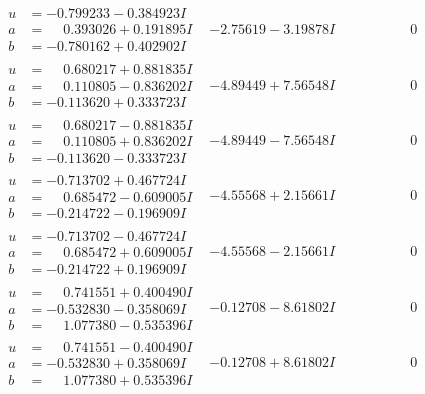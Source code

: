 \documentclass[1p]{elsarticle_modified}
\theoremstyle{definition}
\begin{document}
$$\begin{array}{c|c|c}
\begin{aligned}
u &= -0.799233 - 0.384923 I \\
a &= \phantom{-}0.393026 + 0.191895 I \\
b &= -0.780162 + 0.402902 I\end{aligned}
 & -2.75619 - 3.19878 I & \phantom{-0.000000 } 0 \\ \hline\begin{aligned}
u &= \phantom{-}0.680217 + 0.881835 I \\
a &= \phantom{-}0.110805 - 0.836202 I \\
b &= -0.113620 + 0.333723 I\end{aligned}
 & -4.89449 + 7.56548 I & \phantom{-0.000000 } 0 \\ \hline\begin{aligned}
u &= \phantom{-}0.680217 - 0.881835 I \\
a &= \phantom{-}0.110805 + 0.836202 I \\
b &= -0.113620 - 0.333723 I\end{aligned}
 & -4.89449 - 7.56548 I & \phantom{-0.000000 } 0 \\ \hline\begin{aligned}
u &= -0.713702 + 0.467724 I \\
a &= \phantom{-}0.685472 - 0.609005 I \\
b &= -0.214722 - 0.196909 I\end{aligned}
 & -4.55568 + 2.15661 I & \phantom{-0.000000 } 0 \\ \hline\begin{aligned}
u &= -0.713702 - 0.467724 I \\
a &= \phantom{-}0.685472 + 0.609005 I \\
b &= -0.214722 + 0.196909 I\end{aligned}
 & -4.55568 - 2.15661 I & \phantom{-0.000000 } 0 \\ \hline\begin{aligned}
u &= \phantom{-}0.741551 + 0.400490 I \\
a &= -0.532830 - 0.358069 I \\
b &= \phantom{-}1.077380 - 0.535396 I\end{aligned}
 & -0.12708 - 8.61802 I & \phantom{-0.000000 } 0 \\ \hline\begin{aligned}
u &= \phantom{-}0.741551 - 0.400490 I \\
a &= -0.532830 + 0.358069 I \\
b &= \phantom{-}1.077380 + 0.535396 I\end{aligned}
 & -0.12708 + 8.61802 I & \phantom{-0.000000 } 0 \\ \hline\begin{aligned}

\end{aligned}
\end{array}$$
\end{document}
